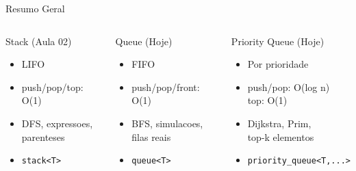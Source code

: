 \documentclass[aspectratio=169,10pt]{beamer}
\begin{document}
\begin{frame}[shrink=2]{Resumo Geral}
  \begin{columns}[t]
      \begin{block}{Stack (Aula 02)}
        \begin{itemize}\footnotesize
          \item LIFO
          \item push/pop/top: O(1)
          \item DFS, expressoes,\\parenteses
          \item \texttt{stack<T>}
        \end{itemize}
      \end{block}
      \begin{block}{Queue (Hoje)}
        \begin{itemize}\footnotesize
          \item FIFO
          \item push/pop/front: O(1)
          \item BFS, simulacoes,\\filas reais
          \item \texttt{queue<T>}
        \end{itemize}
      \end{block}
      \begin{block}{Priority Queue (Hoje)}
        \begin{itemize}\footnotesize
          \item Por prioridade
          \item push/pop: O(log n)\\top: O(1)
          \item Dijkstra, Prim,\\top-k elementos
          \item \texttt{priority\_queue<T,...>}
        \end{itemize}
      \end{block}
  \end{columns}
  \vspace{0.1cm}
  \begin{columns}[t]
      \begin{tcolorbox}[caixaVerde,title={Problemas para Praticar}]
        \footnotesize

\end{tcolorbox}
\end{columns}
\end{frame}
\end{document}
